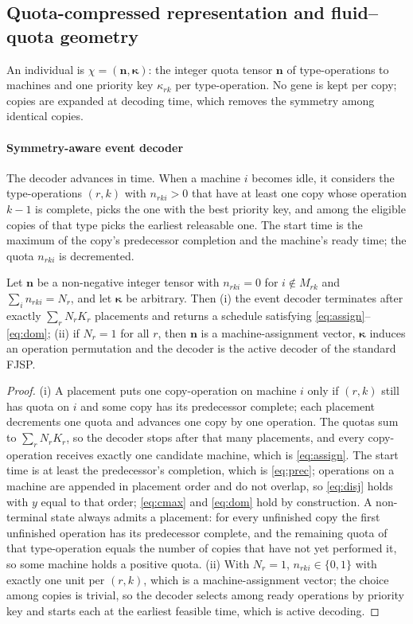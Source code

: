 \subsection{Quota-compressed representation and fluid--quota geometry}\label{sec:quota}
An individual is $\chi = (\mathbf{n}, \boldsymbol{\kappa})$: the integer quota tensor $\mathbf{n}$ of type-operations to
machines and one priority key $\kappa_{rk}$ per type-operation. No gene is kept per copy; copies are expanded at decoding
time, which removes the symmetry among identical copies.

\paragraph{Symmetry-aware event decoder} The decoder advances in time. When a machine $i$ becomes idle, it considers the
type-operations $(r,k)$ with $n_{rki} > 0$ that have at least one copy whose operation $k-1$ is complete, picks the one
with the best priority key, and among the eligible copies of that type picks the earliest releasable one. The start time
is the maximum of the copy's predecessor completion and the machine's ready time; the quota $n_{rki}$ is decremented.

\begin{theorem}\label{thm:decoder}
Let $\mathbf{n}$ be a non-negative integer tensor with $n_{rki} = 0$ for $i \notin M_{rk}$ and $\sum_i n_{rki} = N_r$, and let
$\boldsymbol{\kappa}$ be arbitrary. Then (i) the event decoder terminates after exactly $\sum_r N_r K_r$ placements and
returns a schedule satisfying \eqref{eq:assign}--\eqref{eq:dom}; (ii) if $N_r = 1$ for all $r$, then $\mathbf{n}$ is a
machine-assignment vector, $\boldsymbol{\kappa}$ induces an operation permutation and the decoder is the active decoder of
the standard FJSP.
\end{theorem}
\begin{proof}
(i) A placement puts one copy-operation on machine $i$ only if $(r,k)$ still has quota on $i$ and some copy has its
predecessor complete; each placement decrements one quota and advances one copy by one operation. The quotas sum to
$\sum_r N_r K_r$, so the decoder stops after that many placements, and every copy-operation receives exactly one
candidate machine, which is \eqref{eq:assign}. The start time is at least the predecessor's completion, which is
\eqref{eq:prec}; operations on a machine are appended in placement order and do not overlap, so \eqref{eq:disj} holds with
$y$ equal to that order; \eqref{eq:cmax} and \eqref{eq:dom} hold by construction. A non-terminal state always admits a
placement: for every unfinished copy the first unfinished operation has its predecessor complete, and the remaining quota of
that type-operation equals the number of copies that have not yet performed it, so some machine holds a positive quota.
(ii) With $N_r = 1$, $n_{rki} \in \{0,1\}$ with exactly one unit per $(r,k)$, which is a machine-assignment vector; the
choice among copies is trivial, so the decoder selects among ready operations by priority key and starts each at the
earliest feasible time, which is active decoding.
\end{proof}

